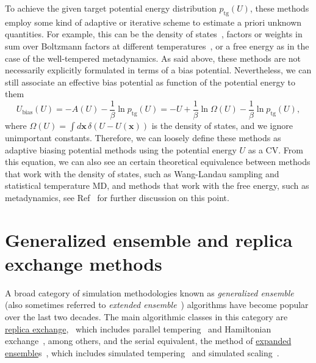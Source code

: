 \documentclass[9pt,review]{livecoms}
\newcommand{\vx}{\mathbf{x}}
\begin{document}
To achieve the given target potential energy distribution $p_{\mathrm{tg}}(U)$, these methods employ some kind of adaptive or iterative scheme to estimate a priori unknown quantities. For example, this can be the density of states~\cite{wang-landau:prl:2001:wang-landau,Kim2006_PRL_STMD,DePablo_DOS_2012}, factors or weights in sum over Boltzmann factors at different temperatures~\cite{Gao_ITS_2008,invernizzi2020unified}, or a free energy as in the case of the well-tempered metadynamics. As said above, these methods are not necessarily explicitly formulated in terms of a bias potential. Nevertheless, we can still associate an effective bias potential as function of the potential energy to them
\begin{equation}
U_\mathrm{bias}(U) = - A(U) -\frac{1}{\beta} \ln p_{\mathrm{tg}}(U) = - U + \frac{1}{\beta} \ln \Omega(U) -\frac{1}{\beta} \ln p_{\mathrm{tg}}(U),
\end{equation}
where $\Omega(U) = \int d\vx \, \delta(U-U(\vx))$ is the density of states, and we ignore unimportant constants. Therefore, we can loosely define these methods as adaptive biasing potential methods using the potential energy $U$ as a CV. From this equation, we can also see an certain theoretical equivalence between methods that work with the density of states, such as Wang-Landau sampling and statistical temperature MD, and methods that work with the free energy, such as metadynamics, see Ref~\cite{Junghans2014wte-wl} for further discussion on this point.

\section{Generalized ensemble and replica exchange methods}
\label{sec:generalized-ensemble}

A broad category of simulation methodologies known as \emph{generalized ensemble}~\cite{okamoto:biopolymers:2001:generalized-ensemble} (also sometimes referred to \emph{extended ensemble}~\cite{iba:intl-j-mod-phys-c:2001:extended-ensemble}) algorithms have become popular over the last two decades.
The main  algorithmic classes in this category are \hyperlink{ref:ReplEx} {replica exchange},~\cite{geyer:conference-proceedings:1991:replica-exchange} which includes parallel tempering~\cite{hukushima-nemoto:j-phys-soc-jpn:1996:parallel-tempering,hansmann:chem-phys-lett:1997:parallel-tempering-monte-carlo,sugita-okamoto:chem-phys-lett:1999:parallel-tempering-md} and Hamiltonian exchange~\cite{sugita-kitao-okamoto:jcp:2000:hamiltonian-exchange,fukunishi-watanabe-takada:jcp:2002:hamiltonian-exchange,jang-shin-pak:prl:2003:hamiltonian-exchange,kwak-hansmann:prl:2005:hamiltonian-exchange}, among others, and the serial equivalent, the method of \hyperlink{ref:ExpEns} {expanded ensemble}s~\cite{lyubartsev:jcp:1992:expanded-ensembles}, which includes simulated tempering~\cite{marinari-parisi:europhys-lett:1992:simulated-tempering,geyer-thompson:j-am-stat-assoc:1995:expanded-ensembles} and simulated scaling~\cite{li-fajer-yang:jcp:2007:simulated-scaling}.
\end{document}
